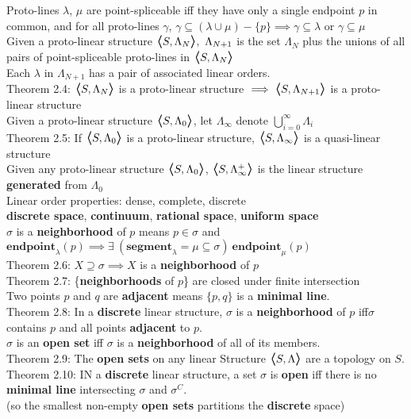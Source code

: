 \documentclass{article}
\newcommand{\bra}[1][1.2]{\scalebox{#1}{$\boldsymbol{\langle}$}}
\newcommand{\nl}[1][12]{\\[#1pt]}
\newcommand{\ket}[1][1.2]{\scalebox{#1}{$\boldsymbol{\rangle}$}}
\newcommand {\chb}[1]{\textbf{#1}}
\begin{document}
\begin{flushleft}
Proto-lines $\lambda$, $\mu$ are point-spliceable iff they have only a single endpoint $p$ in common, and for all proto-lines $\gamma$, $\gamma \subseteq (\lambda \cup \mu) - \{p\} \implies \gamma \subseteq \lambda$ or $\gamma \subseteq \mu$\nl[10]

Given a proto-linear structure $\bra S, \Lambda_N\ket,\ \Lambda_{N+1}$ is the set $ \Lambda_N$ plus the unions of all pairs of point-spliceable proto-lines in $\bra S, \Lambda_N\ket$\nl[10]

Each $\lambda$ in $\Lambda_{N+1}$ has a pair of associated linear orders.\nl[10]

Theorem 2.4: $\bra S, \Lambda_N\ket$ is a proto-linear structure $\implies \bra S, \Lambda_{N+1}\ket$ is a proto-linear structure\nl[10]

Given a proto-linear structure $\bra S, \Lambda_0\ket$, let $\Lambda_\infty$ denote $ \bigcup_{i=0}^\infty\Lambda_i$\nl[10]

Theorem 2.5: If $\bra S, \Lambda_0\ket$ is a proto-linear structure, $\bra S, \Lambda_\infty\ket$ is a quasi-linear structure\nl[10]

Given any proto-linear structure $\bra S, \Lambda_0\ket$, $\bra S, \Lambda_\infty^+\ket$ is the linear structure \chb{generated} from $\Lambda_0$\nl[10]

Linear order properties: dense, complete, discrete\\
\chb{discrete space}, \chb{continuum}, \chb{rational space}, \chb{uniform space}\nl[10]

$\sigma$ is a \chb{neighborhood} of $p$ means $p \in \sigma$ and $\chb{endpoint}_\lambda(p) \implies \exists\  (\chb{segment}_\lambda = \mu \subseteq \sigma) \ \chb{endpoint}_\mu(p)$\nl[10]

Theorem 2.6: $X\supseteq \sigma \implies X$ is a \chb{neighborhood} of $p$\nl[5]

Theorem 2.7: \{\chb{neighborhoods} of $p$\} are closed under finite intersection\nl[10]

Two points $p$ and $q$ are \chb{adjacent} means $\{p, q\}$ is a \chb{minimal line}.\nl

Theorem 2.8: In a \chb{discrete} linear structure, $\sigma$ is a \chb{neighborhood} of $p$ iff$\sigma$ contains $p$ and all points \chb{adjacent} to $p$.\nl

$\sigma$ is an \chb{open set} iff $\sigma$ is a \chb{neighborhood} of all of its members.\nl

Theorem 2.9: The \chb{open sets} on any linear Structure  $\bra S, \Lambda\ket$ are a topology on $S$.\nl

Theorem 2.10: IN a \chb{discrete} linear structure, a set $\sigma$ is \chb{open} iff there is no \chb{minimal line} intersecting $\sigma$ and $\sigma^C$.\nl[3]
(so the smallest non-empty \chb{open sets} partitions the \chb{discrete} space)






\end{flushleft}
\end{document}
